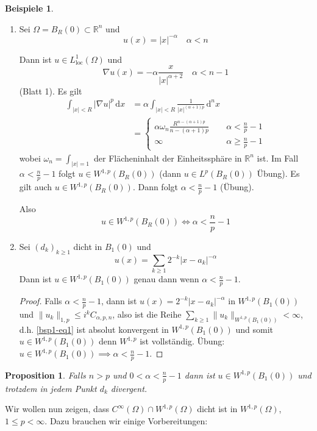 \documentclass[
paper=a4,
bibtotocnumbered,
liststotocnumbered,
tablecaptionabove,
pointlessnumbers,
twoside,
openright,
10pt
]
{report}
\newtheorem{prop}[thm]{Proposition}
\theoremstyle{definition}
\newtheorem*{bspe}{Beispiele}
\numberwithin{equation}{chapter}
\begin{document}
\begin{bspe}
\begin{enumerate}[1)]
\item Sei $\Omega = B_R(0)\subset \mathbb R^n$ und $$u(x)=|x|^{-\alpha} \quad \alpha <n$$

Dann ist $u\in L_{\text{loc}}^1(\Omega)$ und 
$$\nabla u(x)= - \alpha \frac{x}{|x|^{\alpha+2}} \quad \alpha < n-1$$
(Blatt 1). Es gilt
\begin{align*}
\int_{|x|<R} |\nabla u|^p \, \mathrm dx &= \alpha \int_{|x|<R} \frac{1}{|x|^{(\alpha+1)p}} \, \mathrm d^n x\\
&= \begin{cases}
\alpha \omega_n \frac{R^{n-(\alpha+1)p}}{n-(\alpha+1)p} &\ \quad \alpha < \frac{n}{p} -1\\
\infty &\ \quad \alpha \ge \frac{n}{p} -1
\end{cases}
\end{align*}
wobei $\omega_n = \int_{|x|=1}$ der Flächeninhalt der Einheitssphäre in $\mathbb R^n$ ist. Im Fall $\alpha < \frac{n}{p}-1$ folgt $u\in W^{1,p}(B_R(0))$ (dann $u\in L^p(B_R(0))$ Übung). Es gilt auch $u\in W^{1,p}(B_R(0))$. Dann folgt $\alpha < \frac{n}{p}-1$ (Übung). 

Also
$$
u \in W^{1,p}(B_R(0)) \iff \alpha < \frac{n}{p}-1
$$
\item Sei $(d_k)_{k\ge 1}$ dicht in $B_1(0)$ und 
\begin{equation}\label{bsp1-eq1}
u(x) = \sum_{k\ge 1} 2^{-k} |x-a_k|^{-\alpha}
\end{equation}
Dann ist $u\in W^{1,p}(B_1(0))$ genau dann wenn $\alpha < \frac{n}{p}-1$.
\begin{proof}
Falls $\alpha < \frac{n}{p}-1$, dann ist $u(x)=2^{-k} |x-a_k|^{-\alpha}$ in $W^{1,p}(B_1(0))$ und $\| u_k\|_{1,p} \le i^k C_{\alpha, p,n}$, also ist die Reihe $\sum_{k\ge 1} \| u_k \|_{W^{1,p}(B_1(0))} < \infty$, d.h. \eqref{bsp1-eq1} ist absolut konvergent in $W^{1,p}(B_1(0))$ und somit $u\in W^{1,p}(B_1(0))$ denn $W^{1,p}$ ist vollständig. Übung: $u\in W^{1,p}(B_1(0))\implies \alpha < \frac{n}{p}-1$. 
\end{proof}
\end{enumerate}
\end{bspe}

\begin{prop}
Falls $n>p$ und $0<\alpha < \frac{n}{p}-1$ dann ist $u\in W^{1,p}(B_1(0))$ und trotzdem in jedem Punkt $d_k$ divergent.
\end{prop}
Wir wollen nun zeigen, dass $C^\infty(\Omega) \cap W^{1,p}(\Omega)$ dicht ist in $W^{1,p}(\Omega)$, $1\le p <\infty$. Dazu brauchen wir einige Vorbereitungen:
\end{document}
